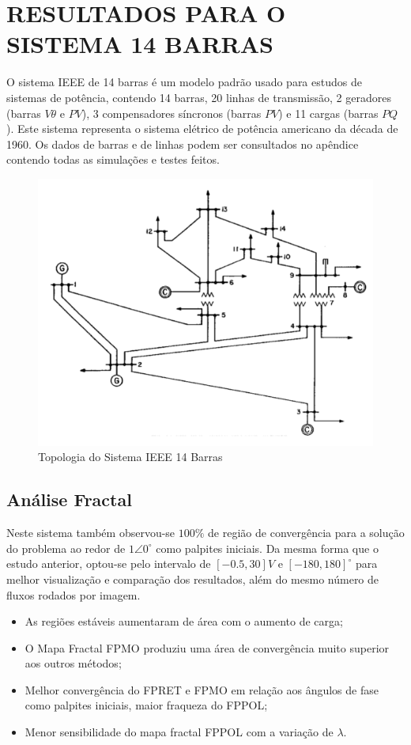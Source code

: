 \section{RESULTADOS PARA O SISTEMA 14 BARRAS}
O sistema IEEE de 14 barras é um modelo padrão usado para estudos de sistemas de potência, contendo 14 barras, 20 linhas de transmissão, 2 geradores (barras $V\theta$ e $PV$), 3 compensadores síncronos (barras $PV$) e 11 cargas (barras $PQ$). Este sistema representa o sistema elétrico de potência americano da década de 1960. Os dados de barras e de linhas podem ser consultados no apêndice contendo todas as simulações e testes feitos.
\begin{figure}[H]
    \centering
    \includegraphics[scale=0.5]{textuais/capitulo4/figuras/IEEE_14BUS.pdf}
    \caption{Topologia do Sistema IEEE 14 Barras}
    \label{fig:enter-label}
\end{figure}

\subsection{Análise Fractal}
Neste sistema também observou-se $100\%$ de região de convergência para a solução do problema ao redor de $1 \angle 0^ \circ$ como palpites iniciais. Da mesma forma que o estudo anterior, optou-se pelo intervalo de $[-0.5, 30]V$ e $[-180, 180]^\circ$ para melhor visualização e comparação dos resultados, além do mesmo número de fluxos rodados por imagem.

\begin{itemize}
    \item As regiões estáveis aumentaram de área com o aumento de carga;
    \item O Mapa Fractal \acs{FPMO} produziu uma área de convergência muito superior aos outros métodos;
    \item Melhor convergência do \acs{FPRET} e \acs{FPMO} em relação aos ângulos de fase como palpites iniciais, maior fraqueza do \acs{FPPOL};
    \item Menor sensibilidade do mapa fractal \acs{FPPOL} com a variação de $\lambda$.
\end{itemize}


